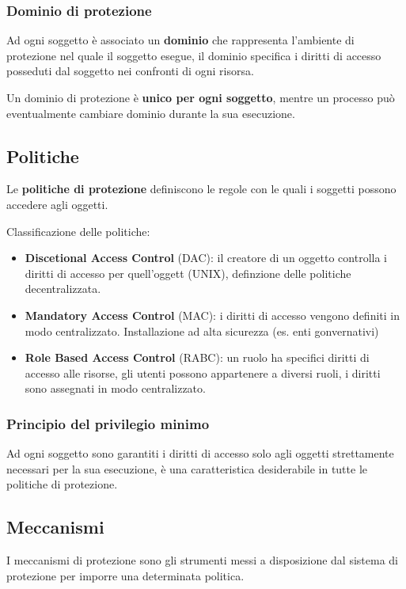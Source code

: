 \subsubsection{Dominio di protezione}
Ad ogni soggetto è associato un \textbf{dominio} che rappresenta l'ambiente di protezione nel quale il soggetto esegue, il dominio specifica i diritti di accesso posseduti dal soggetto nei confronti di ogni risorsa.

Un dominio di protezione è \textbf{unico per ogni soggetto}, mentre un processo può eventualmente cambiare dominio durante la sua esecuzione.

\subsection{Politiche}
Le \textbf{politiche di protezione} definiscono le regole con le quali i soggetti possono accedere agli oggetti.

Classificazione delle politiche:
\begin{itemize}
	\item \textbf{Discetional Access Control} (DAC): il creatore di un oggetto controlla i diritti di accesso per quell'oggett (UNIX), definzione delle politiche decentralizzata.
	\item \textbf{Mandatory Access Control} (MAC): i diritti di accesso vengono definiti in modo centralizzato. Installazione ad alta sicurezza (es. enti gonvernativi)
	\item \textbf{Role Based Access Control} (RABC): un ruolo ha specifici diritti di accesso alle risorse, gli utenti possono appartenere a diversi ruoli, i diritti sono assegnati in modo centralizzato.
\end{itemize}

\subsubsection{Principio del privilegio minimo}
Ad ogni soggetto sono garantiti i diritti di accesso solo agli oggetti strettamente necessari per la sua esecuzione, è una caratteristica desiderabile in tutte le politiche di protezione.

\subsection{Meccanismi}
I meccanismi di protezione sono gli strumenti messi a disposizione dal sistema di protezione per imporre una determinata politica.

